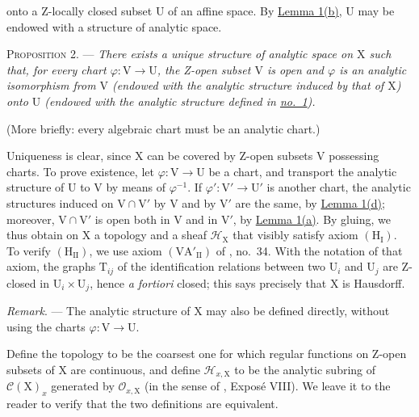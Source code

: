 onto a Z-locally closed subset $\mathrm{U}$ of an affine space. By \hyperref[gaga:lemma:1:item:b]{Lemma 1(b)}, $\mathrm{U}$ may be endowed with a structure of analytic space.

\textsc{Proposition 2}. --- \emph{There exists a unique structure of analytic space on $\mathrm{X}$ such that, for every chart $\varphi:\mathrm{V}\to\mathrm{U}$, the Z-open subset $\mathrm{V}$ is open and $\varphi$ is an analytic isomorphism from $\mathrm{V}$ (endowed with the analytic structure induced by that of $\mathrm{X}$) onto $\mathrm{U}$ (endowed with the analytic structure defined in \hyperref[gaga:no:1]{no.~1}).}

(More briefly: every algebraic chart must be an analytic chart.)

Uniqueness is clear, since $\mathrm{X}$ can be covered by Z-open subsets $\mathrm{V}$ possessing charts. To prove existence, let $\varphi:\mathrm{V}\to\mathrm{U}$ be a chart, and transport the analytic structure of $\mathrm{U}$ to $\mathrm{V}$ by means of $\varphi^{-1}$. If $\varphi':\mathrm{V}'\to\mathrm{U}'$ is another chart, the analytic structures induced on $\mathrm{V}\cap\mathrm{V}'$ by $\mathrm{V}$ and by $\mathrm{V}'$ are the same, by \hyperref[gaga:lemma:1:item:d]{Lemma 1(d)}; moreover, $\mathrm{V}\cap\mathrm{V}'$ is open both in $\mathrm{V}$ and in $\mathrm{V}'$, by \hyperref[gaga:lemma:1:item:a]{Lemma 1(a)}. By gluing, we thus obtain on $\mathrm{X}$ a topology and a sheaf $\mathcal{H}_{\mathrm{X}}$ that visibly satisfy axiom $(\mathrm{H}_{\mathrm{I}})$. To verify $(\mathrm{H}_{\mathrm{II}})$, we use axiom $(\mathrm{VA}'_{\mathrm{II}})$ of , no.~34. With the notation of that axiom, the graphs $\mathrm{T}_{ij}$ of the identification relations between two $\mathrm{U}_i$ and $\mathrm{U}_j$ are Z-closed in $\mathrm{U}_i\times\mathrm{U}_j$, hence \emph{a fortiori} closed; this says precisely that $\mathrm{X}$ is Hausdorff.

\emph{Remark}. --- The analytic structure of $\mathrm{X}$ may also be defined directly, without using the charts $\varphi:\mathrm{V}\to\mathrm{U}$.

Define the topology to be the coarsest one for which regular functions on Z-open subsets of $\mathrm{X}$ are continuous, and define $\mathcal{H}_{x,\mathrm{X}}$ to be the analytic subring of $\mathcal{C}(\mathrm{X})_x$ generated by $\mathcal{O}_{x,\mathrm{X}}$ (in the sense of , Expos\'e VIII). We leave it to the reader to verify that the two definitions are equivalent.

